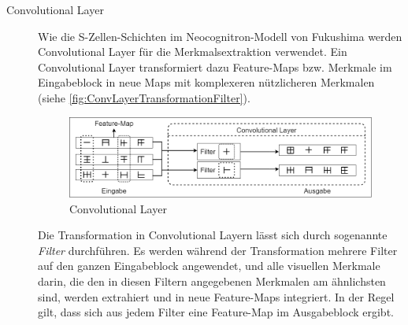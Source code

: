 \begin{description}
	\item[Convolutional Layer] Wie die S-Zellen-Schichten im Neocognitron-Modell von Fukushima werden Convolutional Layer für die Merkmalsextraktion verwendet. Ein Convolutional Layer transformiert dazu Feature-Maps bzw. Merkmale im Eingabeblock in neue Maps mit komplexeren nützlicheren Merkmalen (siehe \autoref{fig:ConvLayerTransformationFilter}).
	

	\begin{figure}[h]
		\centering
		\includegraphics[width=\linewidth]{images/ConvLayerTransformationFilter}
		\caption{Convolutional Layer}
		\label{fig:ConvLayerTransformationFilter}
	\end{figure}
	
	Die Transformation in Convolutional Layern lässt sich durch sogenannte \emph{Filter} durchführen. Es werden während der Transformation mehrere Filter auf den ganzen Eingabeblock angewendet, und alle visuellen Merkmale darin, die den in diesen Filtern angegebenen Merkmalen am ähnlichsten sind, werden extrahiert und in neue Feature-Maps integriert. In der Regel gilt, dass sich aus jedem Filter eine Feature-Map im Ausgabeblock ergibt. 
	

\end{description}
